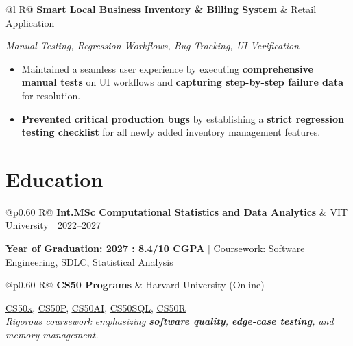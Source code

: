 \documentclass[a4paper,10pt]{article}
\newcommand{\ulink}[2]{\href{#1}{\uline{#2}}}
\newcommand{\subheading}[1]{{\color[HTML]{0A0A0A}\fontsize{12}{14}\selectfont\bfseries #1}}
\newcommand{\techstack}[1]{{\color[HTML]{5C5C5C}\fontsize{10.5}{12.5}\selectfont\itshape #1}}
\newcommand{\meta}[1]{{\color[HTML]{5C5C5C}\fontsize{10.5}{12.5}\selectfont #1}}
\begin{document}
\begin{tabularx}{\linewidth}{@{}l R@{}}
\subheading{\ulink{https://github.com/su-jin1425/Smart-Local-Business-Inventory-Billing-System}{Smart Local Business Inventory \& Billing System}} & \meta{Retail Application}
\end{tabularx}
\vspace{1pt}
\techstack{Manual Testing, Regression Workflows, Bug Tracking, UI Verification}
\begin{itemize}[nosep, leftmargin=1.5em, itemsep=1pt, topsep=2pt]
  \item {\color[HTML]{0A0A0A}\fontsize{11}{14}\selectfont Maintained a seamless user experience by executing \textbf{comprehensive manual tests} on UI workflows and \textbf{capturing step-by-step failure data} for resolution.}
  \item {\color[HTML]{0A0A0A}\fontsize{11}{14}\selectfont \textbf{Prevented critical production bugs} by establishing a \textbf{strict regression testing checklist} for all newly added inventory management features.}
\end{itemize}

\vspace{2pt}

\section{Education}
\vspace{2pt}

\begin{tabularx}{\linewidth}{@{}p{0.60\linewidth} R@{}}
\subheading{Int.MSc Computational Statistics and Data Analytics} & \meta{VIT University $|$ 2022--2027}
\end{tabularx}
\vspace{1pt}
{\color[HTML]{3A3A3A}\fontsize{11}{14}\selectfont \textbf{Year of Graduation: 2027 : 8.4/10 CGPA} $|$ Coursework: Software Engineering, SDLC, Statistical Analysis}

\begin{tabularx}{\linewidth}{@{}p{0.60\linewidth} R@{}}
\subheading{CS50 Programs} & \meta{Harvard University (Online)}
\end{tabularx}
\vspace{1pt}
{\color[HTML]{3A3A3A}\fontsize{11}{14}\selectfont \ulink{https://cs50.harvard.edu/certificates/b14b78df-e05c-413e-a607-1dd27303053a}{CS50x}, \ulink{https://cs50.harvard.edu/certificates/32477052-9db4-49c4-a5a4-d7e58429ca2c}{CS50P}, \ulink{https://cs50.harvard.edu/certificates/9cdb4d4a-1250-4f8e-9fd7-191864e0f919}{CS50AI}, \ulink{https://cs50.harvard.edu/certificates/bc486f24-f085-4e61-8536-80940b97a1b9}{CS50SQL}, \ulink{https://cs50.harvard.edu/certificates/666838e6-a053-4d82-b179-a60fe745fd84}{CS50R} \\[1pt]
\textit{Rigorous coursework emphasizing \textbf{software quality}, \textbf{edge-case testing}, and memory management.}}
\end{document}
